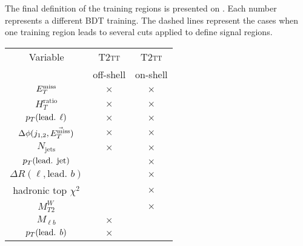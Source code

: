     The final definition of the training regions is presented on .
    Each number represents a different BDT training. The dashed lines represent the cases when
    one training region leads to several cuts applied to define signal regions.

    \begin{table}[h!]
        \begin{center}
            \begin{tabular}{|c|cc|}

                \hline
                Variable                            & \textsc{T2tt} & \textsc{T2tt} \\
                                                    & off-shell     & on-shell      \\
                \hline
                $E_T^\text{miss}$                              & $\times$      & $\times$      \\
                $H_{T}^\text{ratio}$                & $\times$      & $\times$      \\
                $p_T(\text{lead. } \ell)$           & $\times$      & $\times$      \\
                $\Delta\phi(j_{1,2},\vec{E_T^\text{miss}})$    & $\times$      & $\times$      \\
                $N_\text{jets}$                     & $\times$      & $\times$      \\
                $p_T(\text{lead. jet})$             &               & $\times$      \\
                $\Delta R( \ell, \text{lead. } b)$  &               & $\times$      \\
                hadronic top $\chi^2$               &               & $\times$      \\
                $M_{T2}^W$                          &               & $\times$      \\
                $M_{\ell b}$                        & $\times$      &               \\
                $p_T(\text{lead. } b)$              & $\times$      &               \\
                \hline
            \end{tabular}
            \begin{tabular}{|c|ccc|}


\end{tabular}
\end{center}
\end{table}
